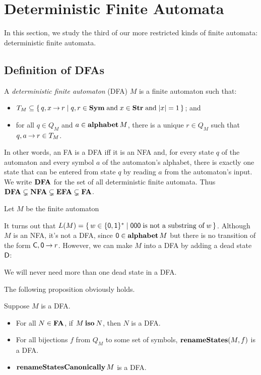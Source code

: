 \section{Deterministic Finite Automata}
\label{DeterministicFiniteAutomata}

In this section, we study the third of our more restricted kinds of
finite automata: deterministic finite automata.

\subsection{Definition of DFAs}

A \emph{deterministic finite automaton} (DFA) $M$ is a finite
automaton such that:
\begin{itemize}
\item $T_M\subseteq\{ \, q,x\mathbin{\to} r \mid q,r\in\mathbf{Sym}\;\allowbreak\mbox{and}\allowbreak\;x\in\mathbf{Str}\;\allowbreak\mbox{and}\allowbreak\;|x|=1 \, \}$;
  and

\item for all $q\in Q_M$ and $a\in\mathbf{alphabet}\,M$, there is a unique $r\in Q_M$
such that $q,a\mathbin{\to} r\in T_M$.
\end{itemize}
In other words, an FA is a DFA iff it is an NFA and, for every state
$q$ of the automaton and every symbol $a$ of the automaton's alphabet,
there is exactly one state that can be entered from state $q$ by
reading $a$ from the automaton's input.  We write $\mathbf{DFA}$ for the set
of all deterministic finite automata.  Thus
$\mathbf{DFA}\subsetneq\mathbf{NFA}\subsetneq\mathbf{EFA}\subsetneq\mathbf{FA}$.

Let $M$ be the finite automaton
\begin{center}

\end{center}
It turns out that $L(M)=
\{ \, w\in\{\mathsf{0,1}\}^* \mid \mathsf{000}\;\allowbreak\mbox{is not a substring
    of}\allowbreak\;w \, \}$.  Although $M$ is an NFA, it's not a DFA, since
$\mathsf{0}\in\mathbf{alphabet}\,M$ but there is no transition of the form
$\mathsf{C},\mathsf{0}\mathbin{\to} r$.  However, we can make $M$ into a DFA by adding a dead
state $\mathsf{D}$:
\begin{center}

\end{center}
We will never need more than one dead state in a DFA.

The following proposition obviously holds.

\begin{proposition}
Suppose $M$ is a DFA.
\begin{itemize}
\item For all $N\in\mathbf{FA}$, if $M\mathbin{\mathbf{iso}} N$, then $N$ is a DFA.

\item For all bijections $f$ from $Q_M$ to some set of symbols,
$\mathbf{renameStates}(M, f)$ is a DFA.

\item $\mathbf{renameStatesCanonically}\,M$ is a DFA.
\end{itemize}
\end{proposition}

